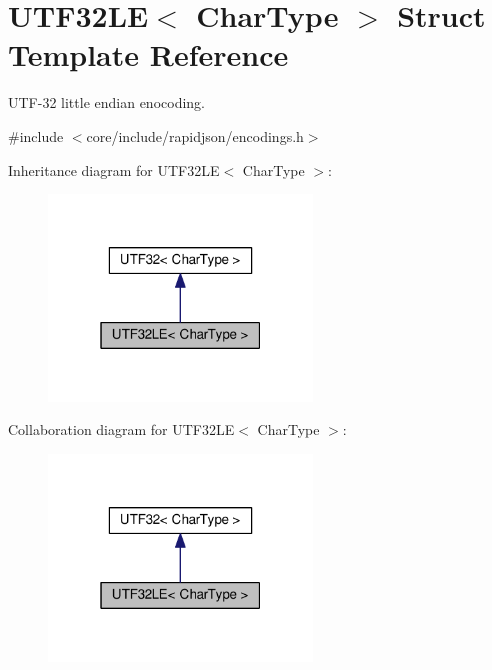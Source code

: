 \hypertarget{structUTF32LE}{}\section{U\+T\+F32\+LE$<$ Char\+Type $>$ Struct Template Reference}
\label{structUTF32LE}


U\+T\+F-\/32 little endian enocoding.  




{\ttfamily \#include $<$core/include/rapidjson/encodings.\+h$>$}



Inheritance diagram for U\+T\+F32\+LE$<$ Char\+Type $>$\+:
\nopagebreak
\begin{figure}[H]
\begin{center}
\leavevmode
\includegraphics[width=199pt]{structUTF32LE__inherit__graph}
\end{center}
\end{figure}


Collaboration diagram for U\+T\+F32\+LE$<$ Char\+Type $>$\+:
\nopagebreak
\begin{figure}[H]
\begin{center}
\leavevmode
\includegraphics[width=199pt]{structUTF32LE__coll__graph}
\end{center}
\end{figure}
